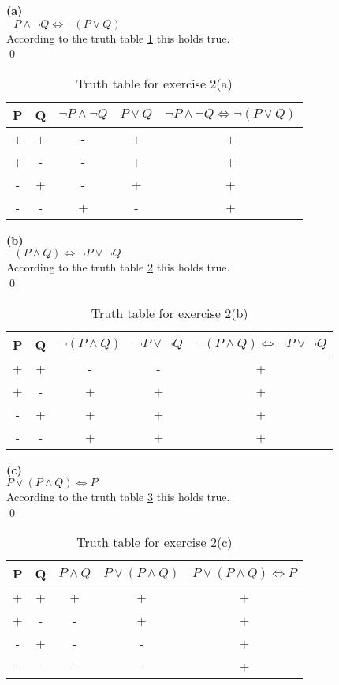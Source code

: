 \documentclass[paper=a4, fontsize=11pt]{scrartcl} %
\numberwithin{equation}{section} %
\numberwithin{figure}{section} %
\numberwithin{table}{section} %
\begin{document}
\textbf{(a)}\\
$\neg P\land\neg Q\Leftrightarrow\neg(P\lor Q)$\\

According to the truth table \ref{tab:ex2a} this holds true.\\\qed

\begin{table}[h]
\begin{tabular}{|c|c|c|c|c|}
\hline
P&Q&$\neg P\land \neg Q$&$P\lor Q$&$\neg P\land \neg Q\Leftrightarrow\neg (P\lor Q)$\\
\hline
+&+&-&+&+\\
+&-&-&+&+\\
-&+&-&+&+\\
-&-&+&-&+\\
\hline
\end{tabular}
\caption{Truth table for exercise 2(a)}
\label{tab:ex2a}
\end{table}

\textbf{(b)}\\
$\neg (P\land Q) \Leftrightarrow\neg P\lor\neg Q$\\
According to the truth table \ref{tab:ex2b} this holds true.\\\qed

\begin{table}[h]
\begin{tabular}{|c|c|c|c|c|}
\hline
P&Q&$\neg (P\land Q)$&$\neg P\lor \neg Q$&$\neg (P\land Q)\Leftrightarrow\neg P\lor \neg Q$\\
\hline
+&+&-&-&+\\
+&-&+&+&+\\
-&+&+&+&+\\
-&-&+&+&+\\
\hline
\end{tabular}
\caption{Truth table for exercise 2(b)}
\label{tab:ex2b}
\end{table}

\textbf{(c)}\\
$P\lor (P\land Q)\Leftrightarrow P$\\
According to the truth table \ref{tab:ex2c} this holds true.\\\qed

\begin{table}[h]
\begin{tabular}{|c|c|c|c|c|}
\hline
P&Q&$P\land Q$&$P\lor (P\land Q)$&$P\lor (P\land Q)\Leftrightarrow P$\\
\hline
+&+&+&+&+\\
+&-&-&+&+\\
-&+&-&-&+\\
-&-&-&-&+\\
\hline
\end{tabular}
\caption{Truth table for exercise 2(c)}
\label{tab:ex2c}
\end{table}
\newpage
\end{document}

